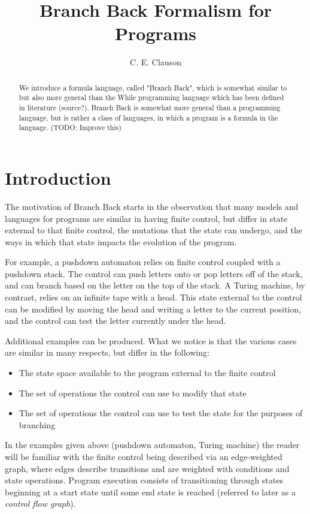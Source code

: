 \documentclass[11pt]{article}
\begin{document}
\title{Branch Back Formalism for Programs}
\author{C. E. Clauson}
\maketitle

\begin{abstract}
We introduce a formula language, called "Branch Back", which is somewhat similar to but also more general than the While programming language which has been defined in literature (source?).  Branch Back is somewhat more general than a programming language, but is rather a class of languages, in which a program is a formula in the language. (TODO: Improve this)
\end{abstract}

\section{Introduction}
The motivation of Branch Back starts in the observation that many models and languages for programs are similar in having finite control, but differ in state external to that finite control, the mutations that the state can undergo, and the ways in which that state impacts the evolution of the program.

For example, a pushdown automaton relies on finite control coupled with a pushdown stack.  The control can push letters onto or pop letters off of the stack, and can branch based on the letter on the top of the stack.  A Turing machine, by contrast, relies on an infinite tape with a head.  This state external to the control can be modified by moving the head and writing a letter to the current position, and the control can test the letter currently under the head.

Additional examples can be produced.  What we notice is that the various cases are similar in many respects, but differ in the following:

\begin{itemize}
\item The state space available to the program external to the finite control
\item The set of operations the control can use to modify that state
\item The set of operations the control can use to test the state for the purposes of branching
\end{itemize}

In the examples given above (pushdown automaton, Turing machine) the reader will be familiar with the finite control being described via an edge-weighted graph, where edges describe transitions and are weighted with conditions and state operations.  Program execution consists of transitioning through states beginning at a start state until some end state is reached (referred to later as a \emph{control flow graph}).
\end{document}
